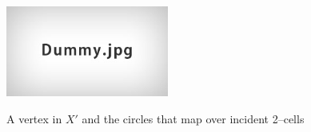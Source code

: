 \begin{figure}
	\centering
	\captionsetup{justification=centering}
	\caption{A vertex in $X'$ and the circles that map over incident 2--cells}
	\includegraphics[height=3cm]{figures/dummy.jpg}
	\label{fig:vertexprime}
\end{figure}